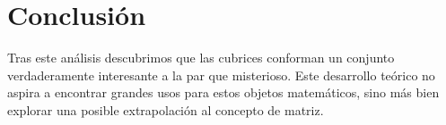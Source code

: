 \documentclass[a4paper, titlepage]{article}
\begin{document}
\section{Conclusión}

Tras este análisis descubrimos que las cubrices conforman un conjunto verdaderamente interesante a la par que misterioso. Este desarrollo teórico no aspira a encontrar grandes usos para estos objetos matemáticos, sino más bien explorar una posible extrapolación al concepto de matriz.
\end{document}
